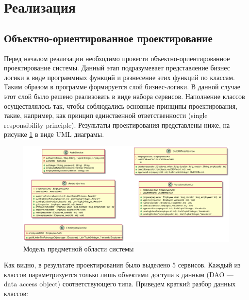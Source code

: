 \section{Реализация}

\subsection{Объектно-ориентированное проектирование}

Перед началом реализации необходимо провести объектно-ориентированное проектирование системы. Данный этап подразумевает представление бизнес
логики в виде программных функций и разнесение этих функций по классам. Таким образом в программе формируется слой бизнес-логики. В данной 
случае этот слой было решено реализовать в виде набора сервисов. Наполнение классов осуществлялось так, чтобы соблюдались основные
принципы проектирования, такие, например, как принцип единственной ответственности (single responsibility principle). Результаты 
проектирования представлены ниже, на рисунке \ref{fig:02-bl} в виде UML диаграмы. 

\begin{figure}[H]
    \centering
    \includegraphics[width=\textwidth]{resources/02_implementation/01_bl.png}
    \caption{Модель предметной области системы}
    \label{fig:02-bl}
\end{figure}

Как видно, в результате проектирования было выделено $5$ сервисов. Каждый из классов параметризуется только лишь объектами доступа к данным
(DAO --- data access object) соответствующего типа. Приведем краткий разбор данных классов:

